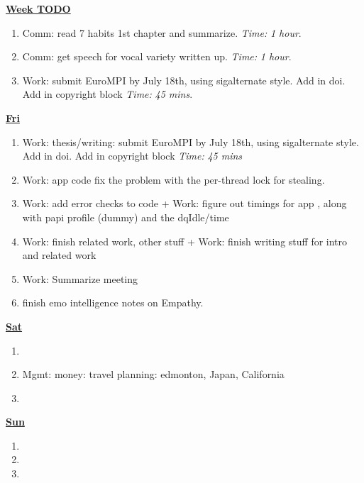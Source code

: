 \documentclass[serif,mathserif,final]{beamer}
\newcommand{\timeEst}[1]{\textit{Time:} \textit{#1}}
\begin{document}
\begin{frame}{}
\begin{columns}[t]
\begin{column}{0.33\linewidth}{\textbf{\underline{Week TODO}}}
\begin{block}
\begin{enumerate}
\item \tiny Comm: read 7 habits 1st chapter and summarize. \timeEst{1 hour}. 

\item \tiny Comm: get speech for vocal variety written up. \timeEst{1 hour}. 

\item \tiny Work: submit EuroMPI by July 18th, using sigalternate style. Add in doi. Add in copyright block \timeEst{45 mins}.  


\end{enumerate} 


\textbf{\underline{Fri}} 
\begin{enumerate} 
\tiny \item \tiny Work: thesis/writing: submit EuroMPI by July 18th, using sigalternate style. Add in doi. Add in copyright block \timeEst{45 mins} 
\item \tiny Work: app code fix the problem with the per-thread lock for stealing. 

\item \tiny Work: add error checks to code + Work: figure out timings for app , along with papi profile (dummy) and the dqIdle/time 

\item \tiny Work: finish related work, other stuff + Work: finish writing stuff for intro and related work 

\item \tiny Work: Summarize meeting 

\item \tiny finish emo intelligence notes on Empathy. 


\end{enumerate} 

\textbf{\underline{Sat}} 
\begin{enumerate} 
\tiny \item \tiny 
\item \tiny Mgmt: money: travel planning: edmonton, Japan, California 
\item \tiny 
\end{enumerate} 


\textbf{\underline{Sun}}

\begin{enumerate} 
\tiny \item \tiny 
\item \tiny 
\item \tiny 
\end{enumerate} 


\end{block}
\end{column}
\end{columns}
\end{frame}
\end{document}
